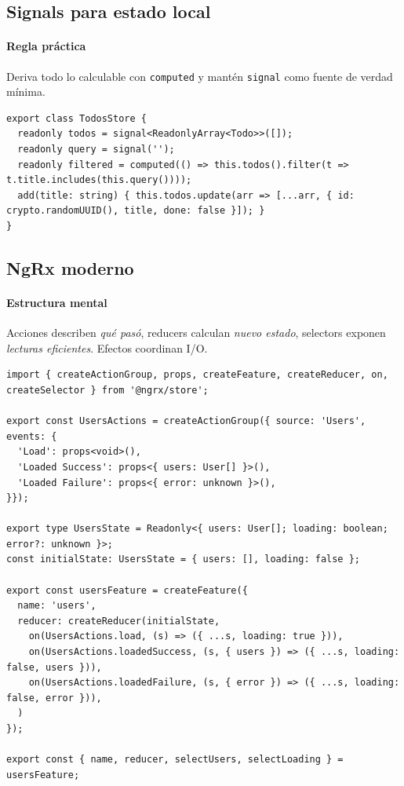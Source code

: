 \documentclass[11pt,a4paper]{article}
\begin{document}
\subsection{Signals para estado local}
\paragraph{Regla práctica}
Deriva todo lo calculable con \texttt{computed} y mantén \texttt{signal} como fuente de verdad mínima.

\begin{lstlisting}[style=tsstyle, caption={Composición de estado con signal/computed/effect}]
export class TodosStore {
  readonly todos = signal<ReadonlyArray<Todo>>([]);
  readonly query = signal('');
  readonly filtered = computed(() => this.todos().filter(t => t.title.includes(this.query())));
  add(title: string) { this.todos.update(arr => [...arr, { id: crypto.randomUUID(), title, done: false }]); }
}
\end{lstlisting}

\subsection{NgRx moderno}
\paragraph{Estructura mental}
Acciones describen \emph{qué pasó}, reducers calculan \emph{nuevo estado}, selectors exponen \emph{lecturas eficientes}. Efectos coordinan I/O.

\begin{lstlisting}[style=tsstyle, caption={Slice con createFeature y efectos tipados}]
import { createActionGroup, props, createFeature, createReducer, on, createSelector } from '@ngrx/store';

export const UsersActions = createActionGroup({ source: 'Users', events: {
  'Load': props<void>(),
  'Loaded Success': props<{ users: User[] }>(),
  'Loaded Failure': props<{ error: unknown }>(),
}});

export type UsersState = Readonly<{ users: User[]; loading: boolean; error?: unknown }>; 
const initialState: UsersState = { users: [], loading: false };

export const usersFeature = createFeature({
  name: 'users',
  reducer: createReducer(initialState,
    on(UsersActions.load, (s) => ({ ...s, loading: true })),
    on(UsersActions.loadedSuccess, (s, { users }) => ({ ...s, loading: false, users })),
    on(UsersActions.loadedFailure, (s, { error }) => ({ ...s, loading: false, error })),
  )
});

export const { name, reducer, selectUsers, selectLoading } = usersFeature;
\end{lstlisting}
\end{document}
